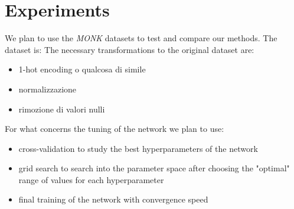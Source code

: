 \section{Experiments}
We plan to use the \textit{MONK} datasets to test and compare our methods. The dataset is:
The necessary transformations to the original dataset are:
\begin{itemize}
    \item 1-hot encoding o qualcosa di simile
    \item normalizzazione
    \item rimozione di valori nulli
\end{itemize}

For what concerns the tuning of the network we plan to use:
\begin{itemize}
    \item cross-validation to study the best hyperparameters of the network
    \item grid search to search into the parameter space after choosing the "optimal" range of values for each hyperparameter
    \item final training of the network with convergence speed
\end{itemize}

